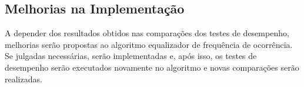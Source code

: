 	
	
	\subsection{Melhorias na Implementação}
	\label{improments}
	
	A depender dos resultados obtidos nas comparações dos testes de desempenho, melhorias serão propostas ao algoritmo equalizador de frequência de ocorrência. Se julgadas necessárias, serão implementadas e, após isso, os testes de desempenho serão executados novamente no algoritmo e novas comparações serão realizadas. 
	